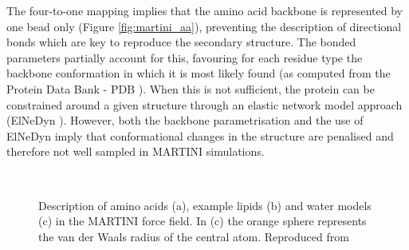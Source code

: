 The four-to-one mapping implies that the amino acid backbone is represented by one bead only (Figure \ref{fig:martini_aa}), preventing the description of directional bonds which are key to reproduce the secondary structure. The bonded parameters partially account for this, favouring for each residue type the backbone conformation in which it is most likely found (as computed from the Protein Data Bank - PDB \cite{PDB}). When this is not sufficient, the protein can be constrained around a given structure through an elastic network model approach (ElNeDyn \cite{Periole2009}). However, both the backbone parametrisation and the use of ElNeDyn imply that conformational changes in the structure are penalised and therefore not well sampled in MARTINI simulations.
%
\begin{figure}[t!]
\centering
{} \\
%
\caption[MARTINI force field mapping for amino acids, lipids and water]{Description of amino acids (a), example lipids (b) and water models (c) in the MARTINI force field. In (c) the orange sphere represents the van der Waals radius of the central atom. Reproduced from \cite{Monticelli2008,calgary_site,Yesylevskyy2010}}
\label{fig:martini}
\end{figure}

